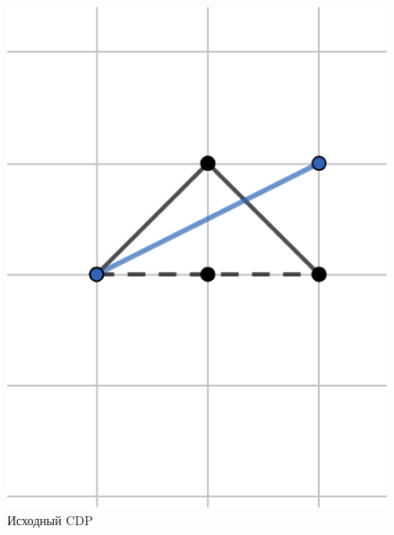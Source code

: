 \documentclass[fontsize=14pt]{scrartcl}
\theoremstyle{definition}
\begin{document}
\begin{figure}[!htb]
  \includegraphics[width=\linewidth]{cdp.png}
  \caption{Исходный CDP}\label{fig:awesome_image1}
\endminipage\hfill
{}

\end{figure}
\end{document}
